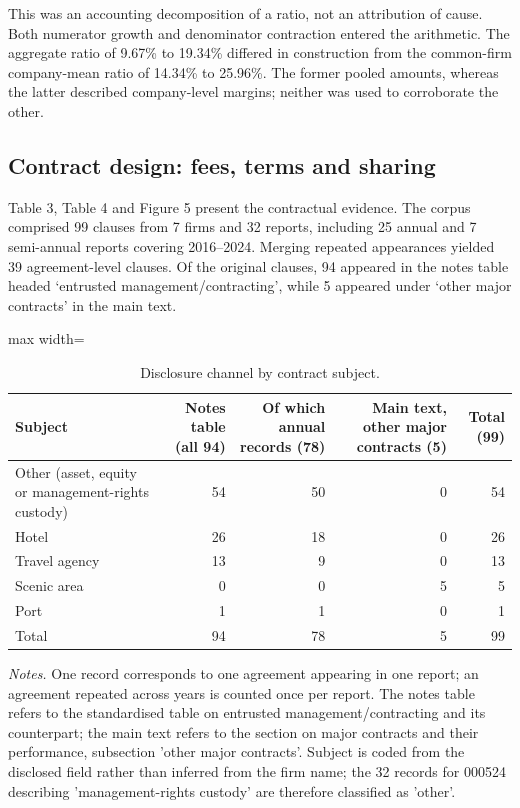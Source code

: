 \documentclass[review,3p,times]{elsarticle}
\begin{document}
This was an accounting decomposition of a ratio, not an attribution of cause. Both numerator growth and denominator contraction entered the arithmetic. The aggregate ratio of 9.67\% to 19.34\% differed in construction from the common-firm company-mean ratio of 14.34\% to 25.96\%. The former pooled amounts, whereas the latter described company-level margins; neither was used to corroborate the other.

\subsection{Contract design: fees, terms and sharing}

Table 3, Table 4 and Figure 5 present the contractual evidence. The corpus comprised 99 clauses from 7 firms and 32 reports, including 25 annual and 7 semi-annual reports covering 2016--2024. Merging repeated appearances yielded 39 agreement-level clauses. Of the original clauses, 94 appeared in the notes table headed `entrusted management/contracting', while 5 appeared under `other major contracts' in the main text.

\begin{table}[!htbp]
\centering
\caption{Disclosure channel by contract subject.}\label{tab:3}
\begin{minipage}{\textwidth}
\centering
\footnotesize
\begin{adjustbox}{max width=\textwidth}
\begin{tabular}{@{}lrrrr@{}}
\toprule
Subject & Notes table (all 94) & Of which annual records (78) & Main text, other major contracts (5) & Total (99) \\
\midrule
Other (asset, equity or management-rights custody) & 54 & 50 & 0 & 54 \\
Hotel & 26 & 18 & 0 & 26 \\
Travel agency & 13 & 9 & 0 & 13 \\
Scenic area & 0 & 0 & 5 & 5 \\
Port & 1 & 1 & 0 & 1 \\
Total & 94 & 78 & 5 & 99 \\
\bottomrule
\end{tabular}
\end{adjustbox}
\par\medskip
\raggedright
\noindent\textit{Notes.} One record corresponds to one agreement appearing in one report; an agreement repeated across years is counted once per report. The notes table refers to the standardised table on entrusted management/contracting and its counterpart; the main text refers to the section on major contracts and their performance, subsection 'other major contracts'. Subject is coded from the disclosed field rather than inferred from the firm name; the 32 records for 000524 describing 'management-rights custody' are therefore classified as 'other'.
\end{minipage}
\end{table}
\end{document}
